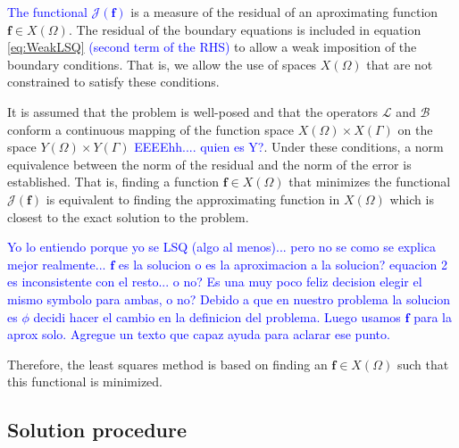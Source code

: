 \documentclass{CFD2011}
\newcommand{\Pablo}[1]{\textcolor{blue}{#1}}
\begin{document}
\Pablo{The functional $\mathcal{J}(\mathbf{f})$} is a measure of the residual of an aproximating function $\mathbf{f}\in X(\Omega)$.
The residual of the boundary equations is included in equation \ref{eq:WeakLSQ} \Pablo{(second term of the RHS)} to allow a weak imposition of the boundary conditions. That is, we allow the use of spaces $X(\Omega)$ that are not constrained to satisfy these conditions.

It is assumed that the problem is well-posed and that the operators $\mathcal{L}$ and $\mathcal{B}$ conform a continuous mapping of the function space $X(\Omega)\times X(\Gamma)$ on the space $Y(\Omega) \times Y(\Gamma)$ \Pablo{EEEEhh.... quien es Y?}. Under these conditions, a norm equivalence between the norm of the residual and the norm of the error is established. That is, finding a function $\mathbf{f}\in X(\Omega)$ that minimizes the functional $\mathcal{J}(\mathbf{f})$ is equivalent to finding the approximating function in $X(\Omega)$ which is closest to the exact solution to the problem.

\Pablo{Yo lo entiendo porque yo se LSQ (algo al menos)... pero no se como se explica mejor realmente... $\mathbf{f}$ es la solucion o es la aproximacion a la solucion? equacion 2 es inconsistente con el resto... o no? Es una muy poco feliz decision elegir el mismo symbolo para ambas, o no? Debido a que en nuestro problema la solucion es $\phi$ decidi hacer el cambio en la definicion del problema. Luego usamos $\mathbf{f}$ para la aprox solo.  Agregue un texto que capaz ayuda para aclarar ese punto.}

Therefore, the least squares method is based on finding an $\mathbf{f} \in X(\Omega)$ such that this functional is minimized. 
%
%
%

\subsection{Solution procedure}
\end{document}
